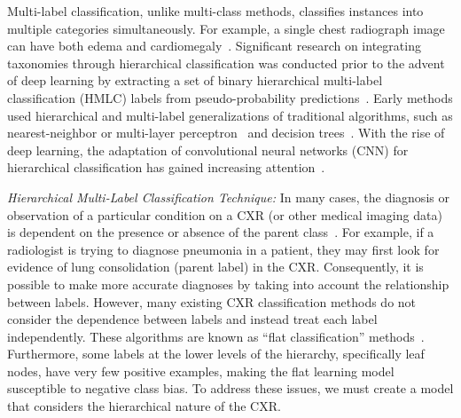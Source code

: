 \documentclass[review,1p,times,numbers]{elsarticle}
\begin{document}
Multi-label classification, unlike multi-class methods, classifies instances into multiple categories simultaneously. For example, a single chest radiograph image can have both edema and cardiomegaly~\cite{harvey_Standardised_2019,tsoumakas_MultiLabel_2007}. Significant research on integrating taxonomies through hierarchical classification was conducted prior to the advent of deep learning by extracting a set of binary hierarchical multi-label classification (HMLC) labels from pseudo-probability predictions~\cite{bi_BayesOptimal_2015}. Early methods used hierarchical and multi-label generalizations of traditional algorithms, such as nearest-neighbor or multi-layer perceptron~\cite{pourghassem_ContentBased_2008} and decision trees~\cite{dimitrovski_Hierarchical_2011}. With the rise of deep learning, the adaptation of convolutional neural networks (CNN) for hierarchical classification has gained increasing attention~\cite{guo_CNNRNN_2018,kowsari_HDLTex_2017,redmon_YOLO9000_2017,roy_TreeCNN_2020}.

\textit{Hierarchical Multi-Label Classification Technique: }
In many cases, the diagnosis or observation of a particular condition on a CXR (or other medical imaging data) is dependent on the presence or absence of the parent class~\cite{vaneeden_Relationship_2012}. For example, if a radiologist is trying to diagnose pneumonia in a patient, they may first look for evidence of lung consolidation (parent label) in the CXR\@. Consequently, it is possible to make more accurate diagnoses by taking into account the relationship between labels\@. However, many existing CXR classification methods do not consider the dependence between labels and instead treat each label independently. These algorithms are known as ``flat classification'' methods~\cite{alaydie_Exploiting_2012}. Furthermore, some labels at the lower levels of the hierarchy, specifically leaf nodes, have very few positive examples, making the flat learning model susceptible to negative class bias. To address these issues, we must create a model that considers the hierarchical nature of the CXR\@.
\end{document}
